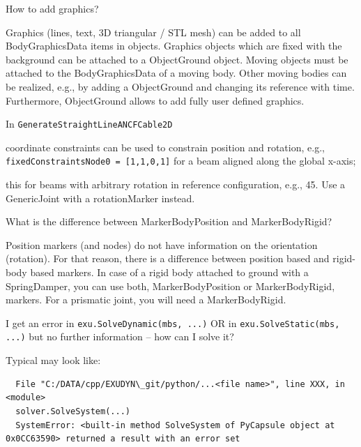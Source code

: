 \item How to add graphics?
\bi
\item[$\ra$] Graphics (lines, text, 3D triangular / \acs{STL} mesh) can be added to all BodyGraphicsData items in objects. Graphics objects which are fixed with the background can be attached to a ObjectGround object. Moving objects must be attached to the BodyGraphicsData of a moving body. Other moving bodies can be realized, e.g., by adding a ObjectGround and changing its reference with time. Furthermore, ObjectGround allows to add fully user defined graphics.
\ei
\item In \texttt{GenerateStraightLineANCFCable2D} 
\bi
\item[$\ra$] coordinate constraints can be used to constrain position and rotation, e.g., \texttt{fixedConstraintsNode0 = [1,1,0,1]} for a beam aligned along the global x-axis; 
\item[$\ra$] this  for beams with arbitrary rotation in reference configuration, e.g., 45\textdegree. Use a GenericJoint with a rotationMarker instead.
\ei
\item What is the difference between MarkerBodyPosition and MarkerBodyRigid?
\bi
\item[$\ra$] Position markers (and nodes) do not have information on the orientation (rotation). For that reason, there is a difference between position based and rigid-body based markers. In case of a rigid body attached to ground with a SpringDamper, you can use both, MarkerBodyPosition or MarkerBodyRigid, markers. For a prismatic joint, you will need a MarkerBodyRigid.
\ei
\item I get an error in \texttt{exu.SolveDynamic(mbs, ...)} OR in \texttt{exu.SolveStatic(mbs, ...)} but no further information -- how can I solve it?
\bi
\item[$\ra$] Typical  may look like:
\begin{lstlisting}
  File "C:/DATA/cpp/EXUDYN\_git/python/...<file name>", line XXX, in <module>
  solver.SolveSystem(...)
  SystemError: <built-in method SolveSystem of PyCapsule object at 0x0CC63590> returned a result with an error set
\end{lstlisting}
